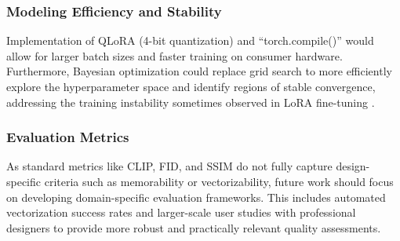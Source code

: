 \subsubsection*{Modeling Efficiency and Stability}
Implementation of QLoRA (4-bit quantization) \cite{dettmers2023qloraefficientfinetuningquantized} and ``torch.compile()'' would allow for larger batch sizes and faster training on consumer hardware. Furthermore, Bayesian optimization could replace grid search to more efficiently explore the hyperparameter space and identify regions of stable convergence, addressing the training instability sometimes observed in LoRA fine-tuning \cite{luo2024privacypreservinglowrankadaptationmembership}.

\subsubsection*{Evaluation Metrics}
As standard metrics like CLIP, FID, and SSIM do not fully capture design-specific criteria such as memorability or vectorizability, future work should focus on developing domain-specific evaluation frameworks. This includes automated vectorization success rates and larger-scale user studies with professional designers to provide more robust and practically relevant quality assessments.
